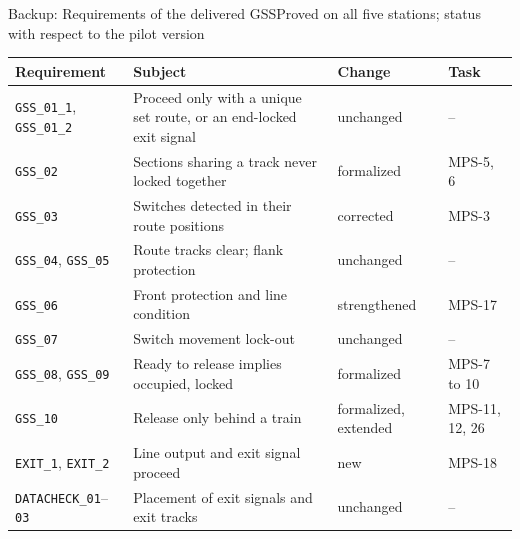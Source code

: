 \documentclass[aspectratio=169,10pt]{beamer}
\newcommand{\smallfont}{\fontsize{7}{8.6}\selectfont}
\begin{document}
\begin{frame}{Backup: Requirements of the delivered GSS}{Proved on all five stations; status with respect to the pilot version}
  \begin{proverbox}[notitle]{}
    \smallfont
    \renewcommand{\arraystretch}{1.25}
    \begin{tabularx}{\linewidth}{@{}P{32mm}LP{24mm}P{22mm}@{}}
      \toprule
      \textbf{Requirement} & \textbf{Subject} & \textbf{Change} & \textbf{Task} \\
      \midrule
      \texttt{GSS\_01\_1}, \texttt{GSS\_01\_2} & Proceed only with a unique set route, or an end-locked exit signal & unchanged & -- \\
      \texttt{GSS\_02} & Sections sharing a track never locked together & formalized & MPS-5, 6 \\
      \texttt{GSS\_03} & Switches detected in their route positions & corrected & MPS-3 \\
      \texttt{GSS\_04}, \texttt{GSS\_05} & Route tracks clear; flank protection & unchanged & -- \\
      \texttt{GSS\_06} & Front protection and line condition & strengthened & MPS-17 \\
      \texttt{GSS\_07} & Switch movement lock-out & unchanged & -- \\
      \texttt{GSS\_08}, \texttt{GSS\_09} & Ready to release implies occupied, locked & formalized & MPS-7 to 10 \\
      \texttt{GSS\_10} & Release only behind a train & formalized, extended & MPS-11, 12, 26 \\
      \texttt{EXIT\_1}, \texttt{EXIT\_2} & Line output and exit signal proceed & new & MPS-18 \\
      \texttt{DATACHECK\_01}--\texttt{03} & Placement of exit signals and exit tracks & unchanged & -- \\
      \bottomrule
    \end{tabularx}
  \end{proverbox}
\end{frame}
\end{document}
